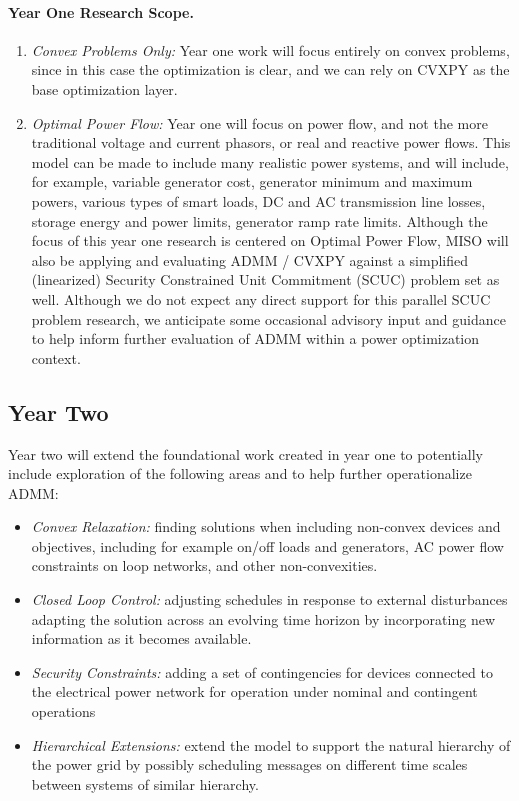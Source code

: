 \documentclass[12pt]{article}
\begin{document}
\paragraph{Year One Research Scope.}
\begin{enumerate}
\item \emph{Convex Problems Only:}
Year one work will focus entirely on convex problems,
since in this case the optimization is clear,
and we can rely on CVXPY as the base optimization layer.

\item \emph{Optimal Power Flow:}
Year one will focus on power flow,
and not the more traditional voltage and current phasors,
or real and reactive power flows.
This model can be made to include many realistic power systems,
and will include, for example, variable generator cost,
generator minimum and maximum powers,
various types of smart loads, DC and AC transmission line losses,
storage energy and power limits,
generator ramp rate limits.
Although the focus of this year one research is centered on Optimal Power Flow,
MISO will also be applying and evaluating ADMM / CVXPY
against a simplified (linearized) Security Constrained
Unit Commitment (SCUC) problem set as well.
Although we do not expect any direct support for
this parallel SCUC problem research,
we anticipate some occasional advisory input and guidance
to help inform further evaluation of ADMM within a power optimization context.

\end{enumerate}

\subsection{Year Two}

Year two will extend the foundational work created in year one
to potentially include exploration of the 
following areas and to help further operationalize ADMM:
\begin{itemize}
\item \emph{Convex Relaxation:} 
finding solutions when including non-convex devices and objectives, 
including for example on/off loads and generators,
AC power flow constraints on loop networks, 
and other non-convexities.

\item \emph{Closed Loop Control:} 
adjusting schedules in response to external disturbances adapting the
solution across an evolving time horizon by incorporating new information as it becomes
available.

\item \emph{Security Constraints:} 
adding a set of contingencies for devices connected to the electrical
power network for operation under nominal and contingent operations
 
\item \emph{Hierarchical Extensions:}
extend the model to support the natural hierarchy of the power grid 
by possibly scheduling messages on different time scales between systems of similar hierarchy.
\end{itemize}
\end{document}
